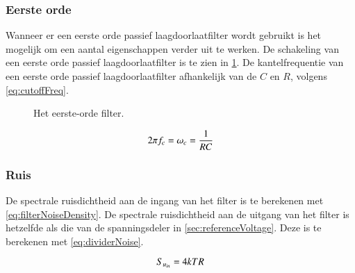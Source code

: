 \subsubsection{Eerste orde}
Wanneer er een eerste orde passief laagdoorlaatfilter wordt gebruikt is het mogelijk om een aantal eigenschappen verder uit te werken.
De schakeling van een eerste orde passief laagdoorlaatfilter is te zien in \cref{fig:filterCircuit}. De kantelfrequentie van een eerste orde passief laagdoorlaatfilter afhankelijk van de $C$ en $R$, volgens \cref{eq:cutoffFreq}.
\begin{figure}[!htbp]
    \centering
    \def\svgwidth{0.3\textwidth}
    
    \caption{Het eerste-orde filter.}
    \label{fig:filterCircuit}
\end{figure}
\begin{equation} \label{eq:cutoffFreq}
    2\pi f_c = \omega_c = \frac{1}{RC}
    \tagaddtext{[\si{\radian\per\second}]}
\end{equation}

\subsubsection{Ruis}
De spectrale ruisdichtheid aan de ingang van het filter is te berekenen met \cref{eq:filterNoiseDensity}.
De spectrale ruisdichtheid aan de uitgang van het filter is hetzelfde als die van de spanningsdeler in \cref{sec:referenceVoltage}. Deze is te berekenen met \cref{eq:dividerNoise}.




\begin{equation} \label{eq:filterNoiseDensity}
    S_{u_{in}} = 4kTR
    \tagaddtext{[\si{\volt\squared\per\hertz}]}
\end{equation}


